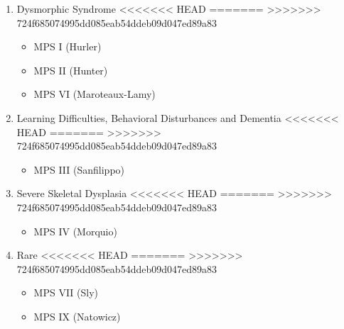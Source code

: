 \documentclass[fontsize=12pt]{scrartcl}
\begin{document}
\begin{enumerate}
\begin{enumerate}
\begin{enumerate}
\begin{enumerate}
\begin{table}[htbp]
\begin{enumerate}
\begin{enumerate}
\begin{enumerate}
\begin{enumerate}
\begin{enumerate}
\begin{enumerate}
\item Dysmorphic Syndrome
<<<<<<< HEAD
\label{sec:orgccf29bf}
=======
\label{sec:org9fd6f63}
>>>>>>> 724f685074995dd085eab54ddeb09d047ed89a83
\begin{itemize}
\item MPS I (Hurler)
\item MPS II (Hunter)
\item MPS VI (Maroteaux-Lamy)
\end{itemize}
\item Learning Difficulties, Behavioral Disturbances and Dementia
<<<<<<< HEAD
\label{sec:orga40fd0c}
=======
\label{sec:orgf9398cf}
>>>>>>> 724f685074995dd085eab54ddeb09d047ed89a83
\begin{itemize}
\item MPS III (Sanfilippo)
\end{itemize}
\item Severe Skeletal Dysplasia
<<<<<<< HEAD
\label{sec:org0aee086}
=======
\label{sec:org696be4e}
>>>>>>> 724f685074995dd085eab54ddeb09d047ed89a83
\begin{itemize}
\item MPS IV (Morquio)
\end{itemize}
\item Rare
<<<<<<< HEAD
\label{sec:orgb0e576c}
=======
\label{sec:org19754b7}
>>>>>>> 724f685074995dd085eab54ddeb09d047ed89a83
\begin{itemize}
\item MPS VII (Sly)
\item MPS IX (Natowicz)
\end{itemize}


\end{enumerate}
\end{enumerate}
\end{enumerate}
\end{enumerate}
\end{enumerate}
\end{enumerate}
\end{table}
\end{enumerate}
\end{enumerate}
\end{enumerate}
\end{enumerate}
\end{document}
